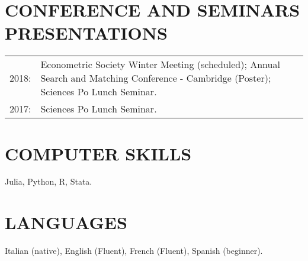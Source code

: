 \documentclass{res}
\begin{document}
\begin{resume}
\section{\small CONFERENCE AND SEMINARS PRESENTATIONS}
 \vspace{5pt}
 \begin{tabular}{@{}p{0.6in}p{5.7in}}
    2018: & Econometric Society Winter Meeting (scheduled); Annual Search and Matching Conference - Cambridge (Poster); Sciences Po Lunch Seminar. \\
	2017: & Sciences Po Lunch Seminar.
\end{tabular}
	 \vspace{5pt}

\section{\small COMPUTER SKILLS}
   \vspace{5pt}
	Julia, Python, R, Stata.

\section{\small LANGUAGES}
   \vspace{5pt}
    Italian (native), English (Fluent), French (Fluent), Spanish (beginner).
    
\end{resume}
\end{document}
